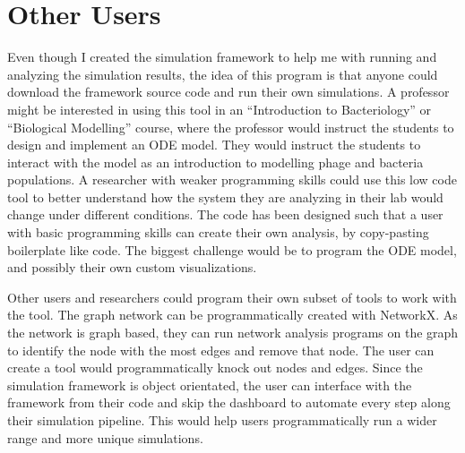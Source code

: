 \section{Other Users}
Even though I created the simulation framework to help me with running and analyzing the simulation results, the idea of this program is that anyone could download the framework source code and run their own simulations. 
A professor might be interested in using this tool in an “Introduction to Bacteriology” or “Biological Modelling” course, where the professor would instruct the students to design and implement an ODE model. 
They would instruct the students to interact with the model as an introduction to modelling phage and bacteria populations. 
A researcher with weaker programming skills could use this low code tool to better understand how the system they are analyzing in their lab would change under different conditions. 
The code has been designed such that a user with basic programming skills can create their own analysis, by copy-pasting boilerplate like code. 
The biggest challenge would be to program the ODE model, and possibly their own custom visualizations. 

Other users and researchers could program their own subset of tools to work with the tool. 
The graph network can be programmatically created with NetworkX. 
As the network is graph based, they can run network analysis programs on the graph to identify the node with the most edges and remove that node. 
The user can create a tool would programmatically knock out nodes and edges. 
Since the simulation framework is object orientated, the user can interface with the framework from their code and skip the dashboard to automate every step along their simulation pipeline. 
This would help users programmatically run a wider range and more unique simulations. 